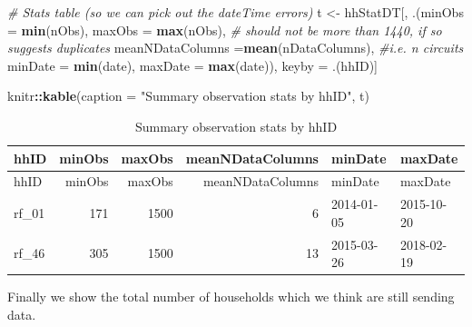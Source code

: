\documentclass[]{article}
\newenvironment{Shaded}{\begin{snugshade}}{\end{snugshade}}
\newcommand{\KeywordTok}[1]{\textcolor[rgb]{0.13,0.29,0.53}{\textbf{#1}}}
\newcommand{\DataTypeTok}[1]{\textcolor[rgb]{0.13,0.29,0.53}{#1}}
\newcommand{\StringTok}[1]{\textcolor[rgb]{0.31,0.60,0.02}{#1}}
\newcommand{\CommentTok}[1]{\textcolor[rgb]{0.56,0.35,0.01}{\textit{#1}}}
\newcommand{\OperatorTok}[1]{\textcolor[rgb]{0.81,0.36,0.00}{\textbf{#1}}}
\newcommand{\NormalTok}[1]{#1}
\begin{document}
\begin{Shaded}
\begin{Highlighting}[]
\CommentTok{# Stats table (so we can pick out the dateTime errors)}
\NormalTok{t <-}\StringTok{ }\NormalTok{hhStatDT[, .(}\DataTypeTok{minObs =} \KeywordTok{min}\NormalTok{(nObs),}
             \DataTypeTok{maxObs =} \KeywordTok{max}\NormalTok{(nObs), }\CommentTok{# should not be more than 1440, if so suggests duplicates}
             \DataTypeTok{meanNDataColumns =}\KeywordTok{mean}\NormalTok{(nDataColumns), }\CommentTok{#i.e. n circuits}
             \DataTypeTok{minDate =} \KeywordTok{min}\NormalTok{(date),}
             \DataTypeTok{maxDate =} \KeywordTok{max}\NormalTok{(date)),}
\NormalTok{         keyby =}\StringTok{ }\NormalTok{.(hhID)]}

\NormalTok{knitr}\OperatorTok{::}\KeywordTok{kable}\NormalTok{(}\DataTypeTok{caption =} \StringTok{"Summary observation stats by hhID"}\NormalTok{, t)}
\end{Highlighting}
\end{Shaded}

\begin{longtable}[]{@{}lrrrll@{}}
\caption{Summary observation stats by hhID}\tabularnewline
\toprule
hhID & minObs & maxObs & meanNDataColumns & minDate &
maxDate\tabularnewline
\midrule
\endfirsthead
\toprule
hhID & minObs & maxObs & meanNDataColumns & minDate &
maxDate\tabularnewline
\midrule
\endhead
rf\_01 & 171 & 1500 & 6 & 2014-01-05 & 2015-10-20\tabularnewline
rf\_46 & 305 & 1500 & 13 & 2015-03-26 & 2018-02-19\tabularnewline
\bottomrule
\end{longtable}

Finally we show the total number of households which we think are still
sending data.
\end{document}
